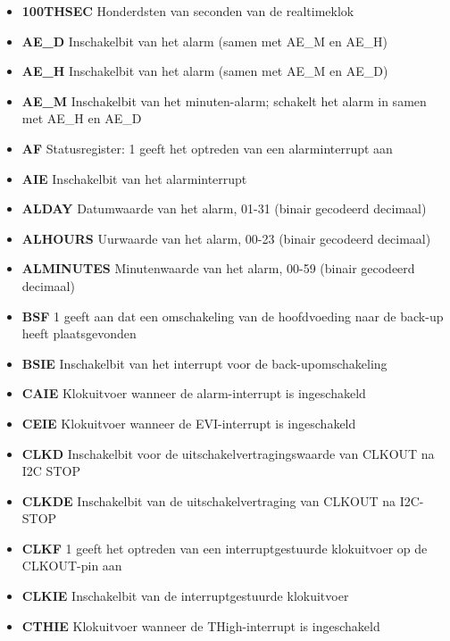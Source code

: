 \begin{itemize}
\item{\bf{100THSEC}} Honderdsten van seconden van de realtimeklok
\item{\bf{AE\_D}} Inschakelbit van het alarm (samen met AE\_M en AE\_H)
\item{\bf{AE\_H}} Inschakelbit van het alarm (samen met AE\_M en AE\_D)
\item{\bf{AE\_M}} Inschakelbit van het minuten-alarm; schakelt het alarm in samen met AE\_H en AE\_D
\item{\bf{AF}} Statusregister: 1 geeft het optreden van een alarminterrupt aan
\item{\bf{AIE}} Inschakelbit van het alarminterrupt
\item{\bf{ALDAY}} Datumwaarde van het alarm, 01-31 (binair gecodeerd decimaal)
\item{\bf{ALHOURS}} Uurwaarde van het alarm, 00-23 (binair gecodeerd decimaal)
\item{\bf{ALMINUTES}} Minutenwaarde van het alarm, 00-59 (binair gecodeerd decimaal)
\item{\bf{BSF}} 1 geeft aan dat een omschakeling van de hoofdvoeding naar de back-up heeft plaatsgevonden
\item{\bf{BSIE}} Inschakelbit van het interrupt voor de back-upomschakeling
\item{\bf{CAIE}} Klokuitvoer wanneer de alarm-interrupt is ingeschakeld
\item{\bf{CEIE}} Klokuitvoer wanneer de EVI-interrupt is ingeschakeld
\item{\bf{CLKD}} Inschakelbit voor de uitschakelvertragingswaarde van CLKOUT na I2C STOP
\item{\bf{CLKDE}} Inschakelbit van de uitschakelvertraging van CLKOUT na I2C-STOP
\item{\bf{CLKF}} 1 geeft het optreden van een interruptgestuurde klokuitvoer op de CLKOUT-pin aan
\item{\bf{CLKIE}} Inschakelbit van de interruptgestuurde klokuitvoer
\item{\bf{CTHIE}} Klokuitvoer wanneer de THigh-interrupt is ingeschakeld

\end{itemize}
